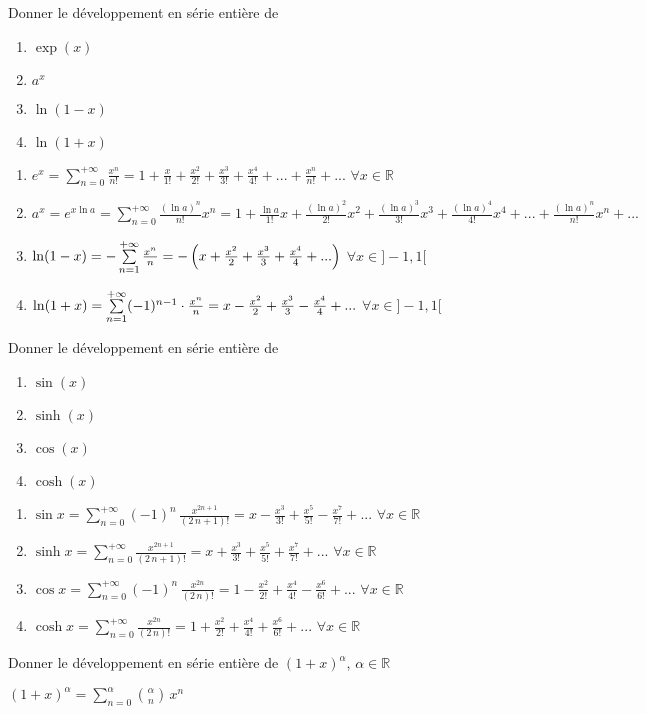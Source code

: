 \documentclass[12pt]{article}
\newcommand*{\xfield}[1]{\begin{mdframed}\centering #1\end{mdframed}\bigskip}
\newenvironment{note}{}{}
\begin{document}
\begin{note}
	\xfield{Donner le développement en série entière de
	\begin{enumerate}
		\item $\exp(x)$
		\item $a^x$
		\item $\ln(1-x)$
		\item $\ln(1+x)$
	\end{enumerate}}
	\xfield{\begin{enumerate}
		\item $e^x=\sum\limits_{n=0}^{+{\infty}}{\frac{x^n}{n!}} = 1 + \frac{x}{1!} + \frac{x^2}{2!} + \frac{x^3}{3!} + \frac{x^4}{4!} + ... + \frac{x^n}{n!} + ...$ $\forall x \in \mathbb{R}$
		\item $a^x= e^{x \ln a} =\sum\limits_{n=0}^{+{\infty}}{\frac{(\ln a)^n}{n!}}x^n = 1 + \frac{\ln a}{1!}x + \frac{(\ln a )^2}{2!}x^2 + \frac{(\ln a )^3}{3!}x^3 + \frac{(\ln a )^4}{4!}x^4 + ... + \frac{(\ln a )^n}{n!}x^n + ...$
		\item $\ln (1-x)=-\sum\limits_{n=1}^{+{\infty}}{x^{n}\over{n}} = - \left( x + \frac{x^2}{2} + \frac{x^3}{3} + \frac{x^4}{4} + ...\right)$ $\forall x \in ]-1,1[$
		\item $\ln (1+x)=\sum\limits_{n=1}^{+{\infty}}(-1)^{n-1} \cdot {x^{n}\over{n}} = x - \frac{x^2}{2} + \frac{x^3}{3} - \frac{x^4}{4} + ...$  $\forall x \in ]-1,1[$
	\end{enumerate}}
\end{note}

\begin{note}
	\xfield{Donner le développement en série entière de
	\begin{enumerate}
	\item $\sin(x)$
	\item $\sinh(x)$
	\item $\cos(x)$
	\item $\cosh(x)$
	\end{enumerate} }
	\xfield{\begin{enumerate}
		\item $ \sin x=\sum\limits_{n=0}^{+{\infty}}(-1)^n\,{\frac{x^{2n+1}}{(2\,n+1)!}} = x - \frac{x^3}{3!} + \frac{x^5}{5!} - \frac{x^7}{7!} + ...$ $\forall x \in \mathbb{R}$
		\item $\sinh x = \sum\limits_{n=0}^{+{\infty}}{\frac{x^{2n+1}}{(2\,n+1)!}} = x + \frac{x^3}{3!} +  \frac{x^5}{5!} +  \frac{x^7}{7!} + ...$ $\forall x \in \mathbb{R}$
		\item $\cos x=\sum\limits_{n=0}^{+{\infty}}(-1)^n\,{\frac{x^{2n}}{(2\,n)!}} = 1 - \frac{x^2}{2!} +\frac{x^4}{4!} -\frac{x^6}{6!} +...$ $\forall x \in \mathbb{R}$
		\item $\cosh x = \sum\limits_{n=0}^{+{\infty}}{\frac{x^{2n}}{(2\,n)!}} = 1 +  \frac{x^2}{2!} +  \frac{x^4}{4!} + \frac{x^6}{6!} + ...$ $\forall x \in \mathbb{R}$
	\end{enumerate} }
\end{note}

\begin{note}
	\xfield{Donner le développement en série entière de $(1+x)^\alpha$, $\alpha \in \mathbb{R}$}
	\xfield{$(1+x)^\alpha = \sum\limits_{n=0}^{\alpha}{{\alpha \choose n}\, x^n}$}
\end{note}
\end{document}
